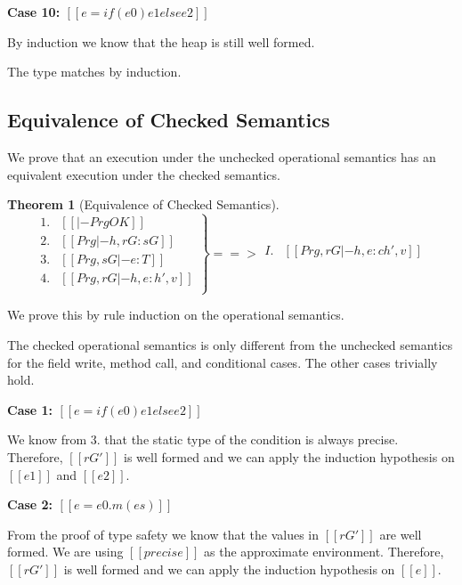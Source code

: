 \documentclass[final,10pt,twoside]{article}
\def\qed{\unskip\kern 10pt{\unitlength1pt\linethickness{.4pt}\framebox(6,6){}}}
\newtheorem{theorem}[definition]{Theorem}
\newcommand\proofcase[1]{\vspace{4mm plus 1mm minus 1mm}\noindent\textbf{#1}}
\begin{document}
\proofcase{Case 10: $[[e = if (e0) { e1 } else { e2 }]]$}

By induction we know that the heap is still well formed.

The type matches by induction.
\qed


\subsection{Equivalence of Checked Semantics}

We prove that an execution under the unchecked operational semantics has an
equivalent execution under the checked semantics.

\begin{theorem}[Equivalence of Checked Semantics]
\label{thm:cs}
\[
\left.
\begin{array}{ll}
1. & [[|- Prg OK]]\\
2. & [[Prg |- h, rG : sG]]\\
3. & [[Prg, sG |- e : T]]\\
4. & [[Prg, rG |- h, e : h', v]]\\
\end{array}
\right\} ==>
\begin{array}{ll}
I. & [[Prg, rG |- h, e :c h', v]]\\
\end{array}
\]
\end{theorem}


We prove this by rule induction on the operational semantics.

The checked operational semantics is only different from the unchecked
semantics for the field write, method call, and conditional cases.
The other cases trivially hold.



\proofcase{Case 1: $[[e = if ( e0 ) { e1 } else { e2 }]]$}

We know from $3.$ that the static type of the condition is always
precise.
Therefore, $[[rG']]$ is well formed and we can apply the induction
hypothesis on $[[e1]]$ and $[[e2]]$.


\proofcase{Case 2: $[[e = e0 . m ( es )]]$}

From the proof of type safety we know that the values in $[[rG']]$ are
well formed. We are using $[[precise]]$ as the approximate environment.
Therefore, $[[rG']]$ is well formed and we can apply the induction
hypothesis on $[[e]]$.
\end{document}
